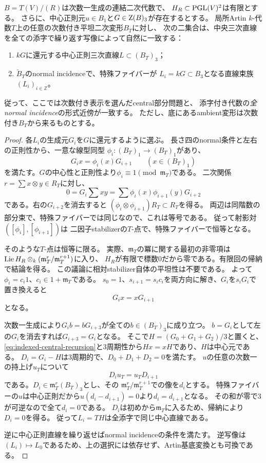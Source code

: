 \begin{proposition}
\label{prop:indexed-normal-central-rigidity}
$B=T(V)/(R)$は次数一生成の連結二次代数で、
$H_R\subset\mathrm{PGL}(V)^2$は有限とする。
さらに、中心正則元$u\in B_1$と$G\in\operatorname{Z}(B)_3$が存在するとする。
局所Artin $k$-代数$T$上の任意の次数付き平坦二次変形$B_T$に対し、
次の二集合は、中央三次直線を全ての添字で繰り返す写像によって自然に一致する：
\begin{enumerate}
\item $kG$に還元する中心正則三次直線$L\subset(B_T)_3$；
\item $\check B_T$のnormal incidenceで、特殊ファイバーが
      $L_i=kG\subset B_3$となる直線束族$(L_i)_{i\in\mathbb Z}$。
\end{enumerate}
従って、ここでは次数付き表示を選んだcentral部分問題と、
添字付き代数の\emph{全normal incidence}の形式近傍が一致する。
ただし、底にあるambient変形は次数付き$B_T$から来るものとする。
\end{proposition}
\begin{proof}
各$L_i$の生成元$G_i$を$G$に還元するように選ぶ。
長さ四のnormal条件と左右の正則性から、一意な線型同型
$\phi_i:(B_T)_1\to(B_T)_1$があり、
\[
 G_i x=\phi_i(x)G_{i+1}\qquad(x\in(B_T)_1)
\]
を満たす。$G$の中心性と正則性より$\phi_i\equiv1\pmod{\mathfrak m_T}$である。
二次関係$r=\sum x\otimes y\in R_T$に対し、
\[
 0=G_i\sum xy
   =\sum\phi_i(x)\phi_{i+1}(y)G_{i+2}
\]
である。右の$G_{i+2}$を消去すると
$(\phi_i\otimes\phi_{i+1})R_T\subset R_T$を得る。
両辺は同階数の部分束で、特殊ファイバーでは同じなので、これは等号である。
従って射影対$([\phi_i],[\phi_{i+1}])$は
二因子stabilizerの$T$-点で、特殊ファイバーで恒等となる。

そのような$T$-点は恒等に限る。
実際、$\mathfrak m_T$の冪に関する最初の非零項は
$\operatorname{Lie} H_R\otimes_k(\mathfrak m_T^r/\mathfrak m_T^{r+1})$に入り、
$H_R$が有限で標数0だから零である。有限回の帰納で結論を得る。
この議論に相対stabilizer自体の平坦性は不要である。
よって$\phi_i=c_i1$、$c_i\in1+\mathfrak m_T$である。
$s_0=1$、$s_{i+1}=s_ic_i$を両方向に解き、$G_i$を$s_iG_i$で置き換えると
\begin{equation}\label{eq:indexed-central-recursion}
 G_i x=xG_{i+1}
\end{equation}
となる。

次数一生成により$G_i b=bG_{i+3}$が全ての$b\in(B_T)_3$に成り立つ。
$b=G_i$として左の$G_i$を消去すれば$G_{i+3}=G_i$となる。
そこで$H=(G_0+G_1+G_2)/3$と置くと、
\eqref{eq:indexed-central-recursion}と3周期性から$Hx=xH$であり、$H$は中心元である。
$D_i=G_i-H$は3周期的で、$D_0+D_1+D_2=0$を満たす。
$u$の任意の次数一の持上げ$u_T$について
\[
 D_i u_T=u_TD_{i+1}
\]
である。$D_i\in\mathfrak m_T^r(B_T)_3$とし、その
$\mathfrak m_T^r/\mathfrak m_T^{r+1}$での像を$d_i$とする。
特殊ファイバーの$u$は中心正則だから$u(d_i-d_{i+1})=0$より$d_i=d_{i+1}$となる。
その和が零で3が可逆なので全て$d_i=0$である。
$D_i$は初めから$\mathfrak m_T$に入るため、帰納により$D_i=0$を得る。
従って$L_i=TH$は全添字で同じ中心直線である。

逆に中心正則直線を繰り返せばnormal incidenceの条件を満たす。
逆写像は$(L_i)\mapsto L_0$であるため、上の選択には依存せず、Artin基底変換とも可換である。
\end{proof}

